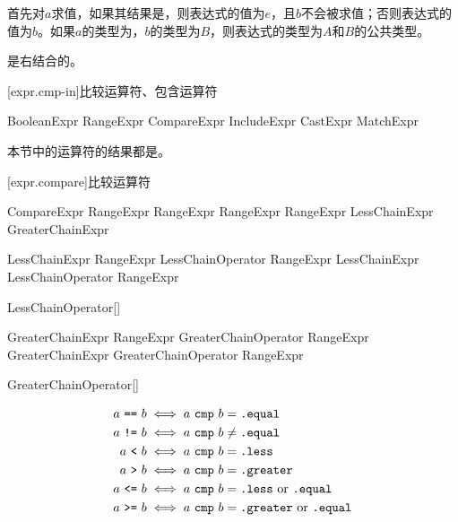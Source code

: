 \pnum
{}首先对$a$求值，如果其结果是，则表达式的值为$e$，且$b$不会被求值；否则表达式的值为$b$。如果$a$的类型为，$b$的类型为$B$，则表达式的类型为$A$和$B$的公共类型。

\pnum
{}是右结合的。

[expr.cmp-in]{比较运算符、包含运算符}

\begin{bnf}{BooleanExpr}
    RangeExpr \br
    CompareExpr \br
    IncludeExpr \br
    CastExpr \br
    MatchExpr
\end{bnf}

\pnum
本节中的运算符的结果都是。

[expr.compare]{比较运算符}

\begin{bnf}{CompareExpr}
    RangeExpr \terminal{!=} RangeExpr \br
    RangeExpr  RangeExpr \br
    LessChainExpr \br
    GreaterChainExpr
\end{bnf}

\begin{bnf}{LessChainExpr}
    RangeExpr LessChainOperator RangeExpr \br
    LessChainExpr LessChainOperator RangeExpr
\end{bnf}

\begin{bnf}{LessChainOperator}[\oneof]
    \terminal{< == <=}
\end{bnf}

\begin{bnf}{GreaterChainExpr}
    RangeExpr GreaterChainOperator RangeExpr \br
    GreaterChainExpr GreaterChainOperator RangeExpr
\end{bnf}

\begin{bnf}{GreaterChainOperator}[\oneof]
    \terminal{> == >=}
\end{bnf}

\begin{align*}
a\ \tcode{==}\ b &\iff a\ \tcode{cmp}\ b = \tcode{.equal} \\
a\ \tcode{!=}\ b &\iff a\ \tcode{cmp}\ b \ne \tcode{.equal} \\
a\ \tcode{<}\ b &\iff a\ \tcode{cmp}\ b = \tcode{.less} \\
a\ \tcode{>}\ b &\iff a\ \tcode{cmp}\ b = \tcode{.greater} \\
a\ \tcode{<=}\ b &\iff a\ \tcode{cmp}\ b = \tcode{.less}\ \mathrm{or} \ \tcode{.equal} \\
a\ \tcode{>=}\ b &\iff a\ \tcode{cmp}\ b = \tcode{.greater}\ \mathrm{or} \ \tcode{.equal} \\
\end{align*}

